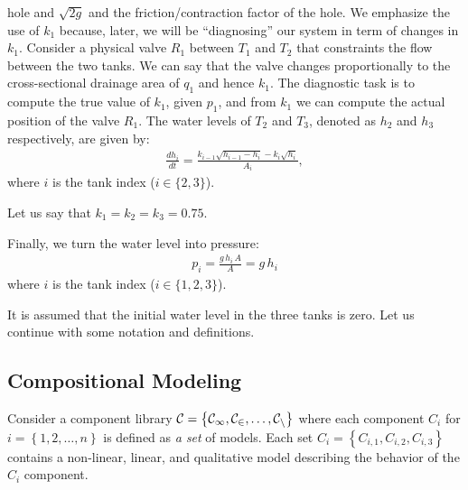hole and $\sqrt{2g}$ and the friction/contraction factor of the
hole. We emphasize the use of $k_1$ because, later, we will be
``diagnosing'' our system in term of changes in $k_1$. Consider a
physical valve $R_1$ between $T_1$ and $T_2$ that constraints the flow
between the two tanks. We can say that the valve changes
proportionally to the cross-sectional drainage area of $q_1$ and hence
$k_1$. The diagnostic task is to compute the true value of $k_1$,
given $p_1$, and from $k_1$ we can compute the actual position of the
valve $R_1$.
%
The water levels of $T_2$ and $T_3$, denoted as $h_2$ and $h_3$
respectively, are given by:
%
\begin{eqnarray}\label{eq:tank1}
%
\frac{d h_i}{dt} = \frac{k_{i - 1} \sqrt{h_{i - 1} - h_i} - k_i \sqrt{h_i}}{A_i},
%
\end{eqnarray}
%
where $i$ is the tank index ($i \in \{2, 3\}$).
\par
Let us say that $k_1 = k_2 = k_3 = 0.75$.
\par
Finally, we turn the water level into pressure:
\begin{eqnarray}
p_i = \frac{g\,h_i\,A}{A} = g\,h_i\label{eq:pressure}
\end{eqnarray}
where $i$ is the tank index ($i \in \{1, 2, 3\}$).
\par
It is assumed that the initial water level in the three tanks is zero.
%
Let us continue with some notation and definitions.
%
\subsection{Compositional Modeling}
%
Consider a component library $\cal{C} = \left\{C_1, C_2, \ldots,
C_n\right\}$ where each component $C_i$ for $i = \left\{1, 2, \ldots,
n\right\}$ is defined as \textit{a set} of models. Each set $C_i =
\left\{C_{i, 1}, C_{i, 2}, C_{i, 3}\right\}$ contains a non-linear,
linear, and qualitative model describing the behavior of the $C_i$
component.

